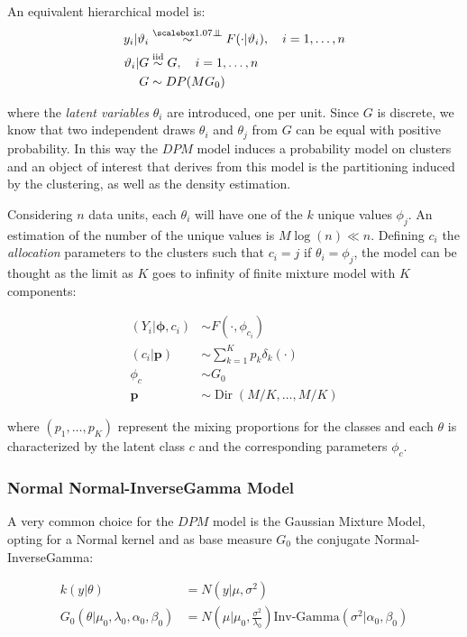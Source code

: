 An equivalent hierarchical model is:
\begin{align}
			y_i | \theta_i &\indsim F(\cdot |\theta_i), \quad i=1,\dots,n \\
			\theta_i | G &\iidsim G, \quad i=1,\dots,n \nonumber \\ 
			G &\sim DP(M G_0) \nonumber
\end{align}

where the \textit{latent variables} $\theta_i$ are introduced, one per unit. Since $G$ is discrete, we know that two independent draws $\theta_i$ and $\theta_j$ from $G$ can be equal with positive probability. In this way the $DPM$ model induces a probability model on clusters and an object of interest that derives from this model is the partitioning induced by the clustering, as well as the density estimation. 


Considering $n$ data units, each $\theta_i$ will have one of the $k$ unique values $\phi_{j}$. An estimation of the number of the unique values is $M\log(n) \ll n$. Defining  $c_i$ the \textit{allocation} parameters to the clusters such that $c_i = j$ if $\theta_i = \phi_j$, the model can be thought as the limit as $K$ goes to infinity of
finite mixture model with $K$ components:

\begin{align}
            	(Y_{i}|\mathbf{\phi},c_{i})&\sim F(\cdot,\phi_{c_{i}}) \\
            	(c_{i}|\mathit{\mathbf{p}})&\sim \sum_{k=1}^K\mathit{p_k} \delta_k(\cdot) \nonumber \\
            	\phi_{c} & \sim G_{0} \nonumber \\
            	\mathbf{p} &\sim \operatorname{Dir}(M/K,\dots,M/K) \nonumber
\end{align}
        

where $(p_1,\dots,p_K)$ represent the mixing proportions for the classes and each $\theta$ is characterized by the latent class $c$ and the corresponding parameters $\phi_c$.


\subsubsection{Normal Normal-InverseGamma Model}
A very common choice for the $DPM$ model is the Gaussian Mixture Model, opting for a Normal kernel and as base measure $G_0$ the conjugate Normal-InverseGamma:

\begin{align}
            	k(y|\theta)&=N(y| \mu ,\sigma^2)  \\
            	G_0(\theta|\mu_0,\lambda_0, \alpha_0, \beta_0)&=N\left(\mu | \mu_0 ,\frac{\sigma^2} {\lambda_0}\right)\text{Inv-Gamma}(\sigma^2|\alpha_0, \beta_0 )
\end{align}

